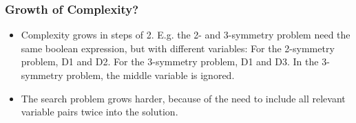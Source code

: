 \begin{frame}
\frametitle{
Growth of Complexity?
}
\begin{itemize}
\item Complexity grows in steps of 2.
       E.g. the 2- and 3-symmetry problem need the same boolean expression,
       but with different variables:
       For the 2-symmetry problem, D1 and D2.
       For the 3-symmetry problem, D1 and D3.
In the 3-symmetry problem, the middle variable is ignored.
\item The search problem grows harder, because of the need to include all 
       relevant variable pairs twice into the solution.
\end{itemize}
\end{frame}